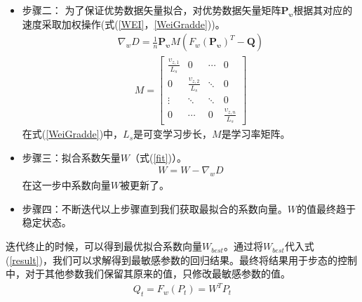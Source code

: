 \begin{itemize}
	\item 步骤二： 为了保证优势数据矢量拟合，对优势数据矢量矩阵$\bm{P_{\upsilon}}$根据其对应的速度采取加权操作(式(\ref{WEI}，\ref{WeiGradde}))。
	\begin{eqnarray}\label{WEI}
	\nabla_{w}D=\frac{1}{n}\bm{P_{\upsilon}}M(F_{w}(\bm{P_{\upsilon}})^{T}-\bm{Q})
	\end{eqnarray}
	\begin{eqnarray}\label{WeiGradde}
	M=\begin{bmatrix}
	\frac{\upsilon_{z,1}}{L_{s}}&0&\cdots&0\\
	0&\frac{\upsilon_{z,2}}{L_{s}}&\ddots&0\\
	\vdots&\ddots&\ddots&0\\
	0&\cdots&0&\frac{\upsilon_{z,n}}{L_{s}}
	\end{bmatrix}
	\end{eqnarray}
	在式(\ref{WeiGradde})中，$L_s$是可变学习步长，$M$是学习率矩阵。
	
	\item 步骤三：拟合系数矢量$W$（式(\ref{fit})）。
	\begin{eqnarray}\label{fit}
	W=W-\nabla_{w}D
	\end{eqnarray}
	在这一步中系数向量$W$被更新了。
	
	\item 步骤四：不断迭代以上步骤直到我们获取最拟合的系数向量。$W$的值最终趋于稳定状态。
\end{itemize}

迭代终止的时候，可以得到最优拟合系数向量$W_{best}$。通过将$W_{best}$代入式(\ref{result})，我们可以求解得到最敏感参数的回归结果。最终将结果用于步态的控制中，对于其他参数我们保留其原来的值，只修改最敏感参数的值。
\begin{eqnarray}\label{result}
Q_{t} = F_{w}(P_{t})=W^{T}P_{t}
\end{eqnarray}